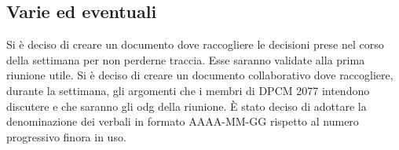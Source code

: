 \subsection*{Varie ed eventuali}
Si è deciso di creare un documento dove raccogliere le decisioni prese nel corso della settimana per non perderne traccia. Esse saranno validate alla prima riunione utile. Si è deciso di creare un documento collaborativo dove raccogliere, durante la settimana, gli argomenti che i membri di DPCM 2077 intendono discutere e che saranno gli odg della riunione.
È stato deciso di adottare la denominazione dei verbali in formato AAAA-MM-GG rispetto al numero progressivo finora in uso.